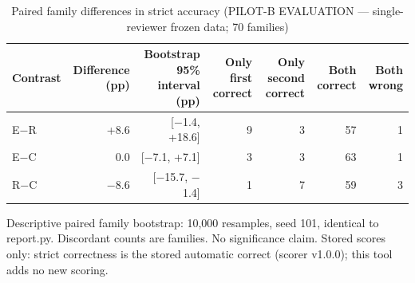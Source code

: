 \begin{table}[t]
\centering
\small
\caption{Paired family differences in strict accuracy (PILOT-B EVALUATION --- single-reviewer frozen data; 70 families)}
\label{tab:pilotb-Qwen3-4B-paired}
\begin{tabular}{lrrrrrr}
\toprule
Contrast & Difference (pp) & Bootstrap 95\% interval (pp) & Only first correct & Only second correct & Both correct & Both wrong \\
\midrule
E$-$R & +8.6 & [$-$1.4, +18.6] & 9 & 3 & 57 & 1 \\
E$-$C & 0.0 & [$-$7.1, +7.1] & 3 & 3 & 63 & 1 \\
R$-$C & $-$8.6 & [$-$15.7, $-$1.4] & 1 & 7 & 59 & 3 \\
\bottomrule
\end{tabular}
\par\smallskip
\parbox{\linewidth}{\footnotesize Descriptive paired family bootstrap: 10,000 resamples, seed 101, identical to report.py. Discordant counts are families. No significance claim. Stored scores only: strict correctness is the stored automatic correct (scorer v1.0.0); this tool adds no new scoring.}
\end{table}
